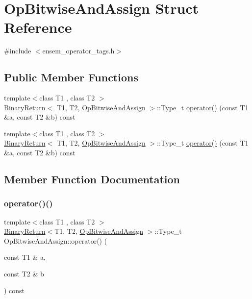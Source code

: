 \hypertarget{structOpBitwiseAndAssign}{}\section{Op\+Bitwise\+And\+Assign Struct Reference}
\label{structOpBitwiseAndAssign}


{\ttfamily \#include $<$ensem\+\_\+operator\+\_\+tags.\+h$>$}

\subsection*{Public Member Functions}
\begin{DoxyCompactItemize}
\item 
{\footnotesize template$<$class T1 , class T2 $>$ }\\\mbox{\hyperlink{structBinaryReturn}{Binary\+Return}}$<$ T1, T2, \mbox{\hyperlink{structOpBitwiseAndAssign}{Op\+Bitwise\+And\+Assign}} $>$\+::Type\+\_\+t \mbox{\hyperlink{structOpBitwiseAndAssign_a0ff733a94050f1eb8c0e52a8b1b27c01}{operator()}} (const T1 \&a, const T2 \&b) const
\item 
{\footnotesize template$<$class T1 , class T2 $>$ }\\\mbox{\hyperlink{structBinaryReturn}{Binary\+Return}}$<$ T1, T2, \mbox{\hyperlink{structOpBitwiseAndAssign}{Op\+Bitwise\+And\+Assign}} $>$\+::Type\+\_\+t \mbox{\hyperlink{structOpBitwiseAndAssign_a0ff733a94050f1eb8c0e52a8b1b27c01}{operator()}} (const T1 \&a, const T2 \&b) const
\end{DoxyCompactItemize}


\subsection{Member Function Documentation}
\mbox{\label{structOpBitwiseAndAssign_a0ff733a94050f1eb8c0e52a8b1b27c01}} 
\subsubsection{\texorpdfstring{operator()()}{operator()()}\hspace{0.1cm}{\footnotesize\ttfamily [1/2]}}
{\footnotesize\ttfamily template$<$class T1 , class T2 $>$ \\
\mbox{\hyperlink{structBinaryReturn}{Binary\+Return}}$<$T1, T2, \mbox{\hyperlink{structOpBitwiseAndAssign}{Op\+Bitwise\+And\+Assign}} $>$\+::Type\+\_\+t Op\+Bitwise\+And\+Assign\+::operator() (\begin{DoxyParamCaption}\item[{const T1 \&}]{a,  }\item[{const T2 \&}]{b }\end{DoxyParamCaption}) const\hspace{0.3cm}{\ttfamily [inline]}}

